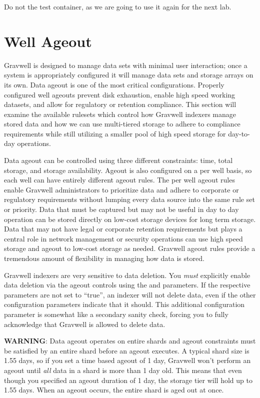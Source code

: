 {{Do not  the test container, as we are
going to use it again for the next lab.

\section{Well Ageout}
Gravwell is designed to manage data sets with minimal user interaction;
once a system is appropriately configured it will manage data sets and
storage arrays on its own. Data ageout is one of the most critical
configurations. Properly configured well ageouts prevent disk
exhaustion, enable high speed working datasets, and allow for regulatory
or retention compliance. This section will examine the available
rulesets which control how Gravwell indexers manage stored data and how
we can use multi-tiered storage to adhere to compliance requirements
while still utilizing a smaller pool of high speed storage for
day-to-day operations.

Data ageout can be controlled using three different constraints: time,
total storage, and storage availability. Ageout is also configured on a
per well basis, so each well can have entirely different ageout rules.
The per well ageout rules enable Gravwell administrators to prioritize
data and adhere to corporate or regulatory requirements without lumping
every data source into the same rule set or priority. Data that must be
captured but may not be useful in day to day operation can be stored
directly on low-cost storage devices for long term storage. Data that
may not have legal or corporate retention requirements but plays a
central role in network management or security operations can use high
speed storage and ageout to low-cost storage as needed. Gravwell ageout
rules provide a tremendous amount of flexibility in managing how data is
stored.

Gravwell indexers are very sensitive to data deletion. You
\emph{must} explicitly enable data deletion via the ageout controls using
the  and  parameters. If the
respective parameters are not set to ``true'', an indexer will not
delete data, even if the other configuration parameters indicate that it
should. This additional configuration parameter is somewhat like a
secondary sanity check, forcing you to fully acknowledge that Gravwell
is allowed to delete data.

\textbf{WARNING}: Data ageout operates on entire shards and ageout constraints
must be satisfied by an entire shard before an ageout executes. A
typical shard size is 1.55 days, so if you set a time based ageout of 1
day, Gravwell won't perform an ageout until \emph{all} data in a shard is
more than 1 day old. This means that even though you specified an
ageout duration of 1 day, the storage tier will hold up to 1.55 days.
When an ageout occurs, the entire shard is aged out at once.

}}
